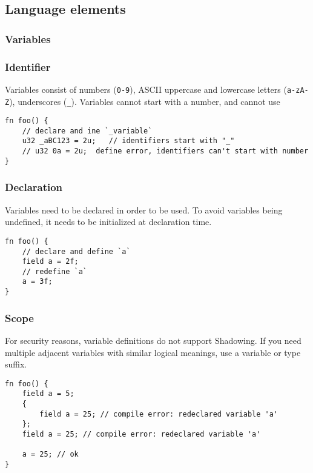 \subsection{Language elements}\label{section: ola-lang-language-elements}


\subsubsection{Variables}

\subsubsection*{Identifier}

Variables consist of numbers (\texttt{0-9}), ASCII uppercase and lowercase letters (\texttt{a-zA-Z}), underscores (\texttt{\_}).
Variables cannot start with a number, and cannot use 

\begin{lstlisting}
fn foo() {
    // declare and ine `_variable`
    u32 _aBC123 = 2u;   // identifiers start with "_"
    // u32 0a = 2u;  define error, identifiers can't start with number
}
\end{lstlisting}

\subsubsection*{Declaration}

Variables need to be declared in order to be used. To avoid variables being undefined, it needs to be initialized at declaration time. 

\begin{lstlisting}
fn foo() {
    // declare and define `a`
    field a = 2f;
    // redefine `a`
    a = 3f;
}
\end{lstlisting}

\subsubsection*{Scope}

For security reasons, variable definitions do not support Shadowing. 
If you need multiple adjacent variables with similar logical meanings, use a variable or type suffix.

\begin{lstlisting}
fn foo() {
    field a = 5;
    {        
        field a = 25; // compile error: redeclared variable 'a'
    };    
    field a = 25; // compile error: redeclared variable 'a'

    a = 25; // ok
}
\end{lstlisting}

